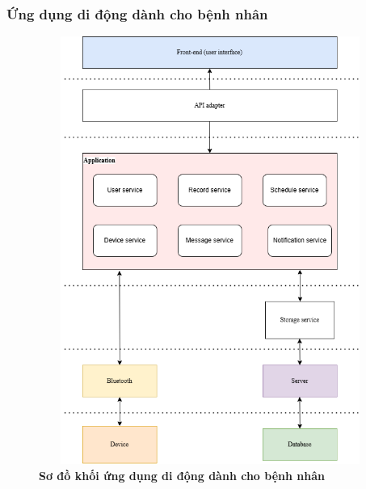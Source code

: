 \subsubsection{Ứng dụng di động dành cho bệnh nhân}
\begin{figure}[H]
  \centering
  \includegraphics[width=12cm,height=14cm]{Images/System/fmECG_architecture-Patient-App.drawio.png}
  \caption[Sơ đồ khối ứng dụng di động dành cho bệnh nhân]{\bfseries \fontsize{12pt}{0pt}\selectfont Sơ đồ khối ứng dụng di động dành cho bệnh nhân}
  \label{fmECG_architecture-Patient-App} %
\end{figure}



